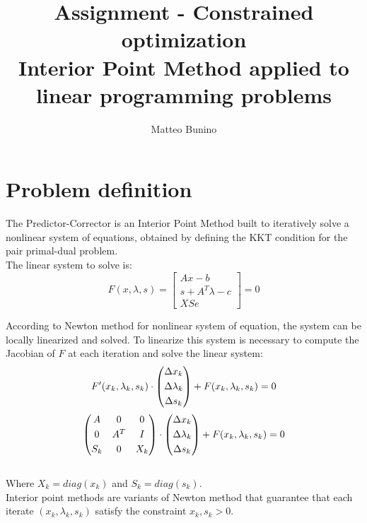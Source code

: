 \documentclass[]{article}
\title{Assignment - Constrained optimization\\Interior Point Method applied to linear programming
	problems}
\author{Matteo Bunino}
\begin{document}
\maketitle

\section{Problem definition}
The Predictor-Corrector is an Interior Point Method built to iteratively solve a nonlinear system of equations, obtained by defining the KKT condition for the pair primal-dual problem.\\
The linear system to solve is:
\begin{equation*}
	F(x,\lambda, s) = 
	\begin{bmatrix}
	Ax-b \\[0.3em]
	s+A^T\lambda-c \\[0.3em]
	XSe          
	\end{bmatrix}
	=0
\end{equation*}

According to Newton method for nonlinear system of equation, the system can be locally linearized and solved. To linearize this system is necessary to compute the Jacobian of $F$ at each iteration and solve the linear system:
\begin{equation*}
	F'(x_k,\lambda_k, s_k) \cdot 
	\begin{pmatrix}
	\Delta x_k \\[0.3em]
	\Delta \lambda_k \\[0.3em]
	\Delta s_k           
	\end{pmatrix}
	+ F(x_k,\lambda_k, s_k)=0\\
\end{equation*}
\begin{equation*}
\begin{pmatrix}
A & 0 & 0 \\[0.3em]
0 & A^T & I \\[0.3em]
S_k & 0 & X_k           
\end{pmatrix}
\cdot 
\begin{pmatrix}
\Delta x_k \\[0.3em]
\Delta \lambda_k \\[0.3em]
\Delta s_k           
\end{pmatrix}
+ F(x_k,\lambda_k, s_k)=0\\
\end{equation*}
\\
Where $X_k=diag(x_k)$ and $S_k=diag(s_k)$.\\
Interior point methods are variants of Newton method that guarantee that each iterate $(x_k, \lambda_k, s_k)$ satisfy the constraint $x_k, s_k>0$.
\pagebreak
\end{document}
